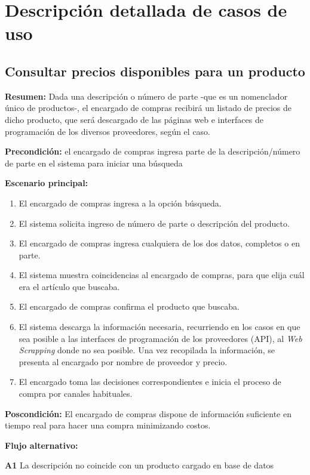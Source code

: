 
\section{Descripción detallada de casos de uso}

\subsection{Consultar precios disponibles para un producto}

\textbf{Resumen:}
Dada una descripción o número de parte
-que es un nomenclador único de productos-,
el encargado de compras recibirá un listado de precios de dicho producto,
que será descargado de las páginas web e interfaces de programación de los diversos proveedores,
según el caso.

\textbf{Precondición:} 
el encargado de compras ingresa parte de la descripción/número de parte en el sistema para iniciar una búsqueda

\textbf{Escenario principal:}
\begin{enumerate}
	\item El encargado de compras ingresa a la opción búsqueda.
	\item El sistema solicita ingreso de número de parte o descripción del producto.
	\item El encargado de compras ingresa cualquiera de los dos datos, completos o en parte.
	\item El sistema muestra coincidencias al encargado de compras, para que elija cuál era el artículo que buscaba.
	\item El encargado de compras confirma el producto que buscaba.
	\item El sistema descarga la información necesaria, 
	recurriendo en los casos en que sea posible a las interfaces de programación de los proveedores (API),
	al \textit{Web Scrapping} donde no sea posible. Una vez recopilada la información, 
	se presenta al encargado por nombre de proveedor y precio.
	\item El encargado toma las decisiones correspondientes e inicia el proceso de compra por canales habituales.
\end{enumerate}

\textbf{Poscondición:}
El encargado de compras dispone de información suficiente en tiempo real para hacer una compra minimizando costos.

\textbf{Flujo alternativo:}

\textbf{A1} La descripción no coincide con un producto cargado en base de datos 

